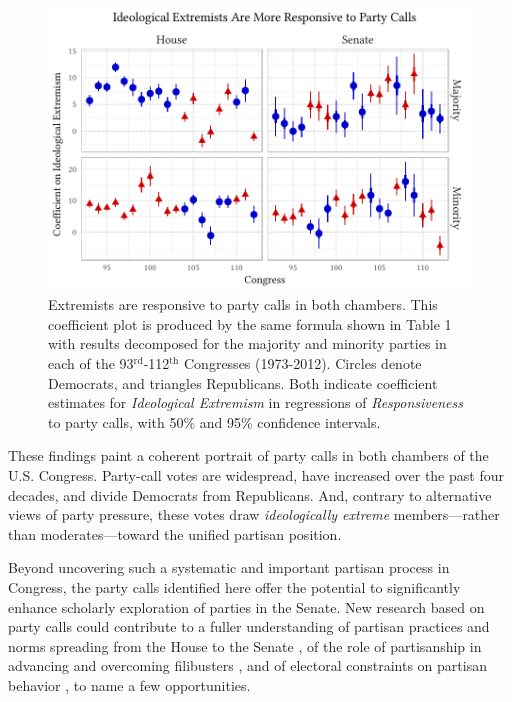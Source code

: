 \documentclass[12pt]{article}
\begin{document}
\begin{figure}[t]
\centering
\includegraphics{extremism-responsiveness.pdf}
\caption{Extremists are responsive to party calls in both chambers.
This coefficient plot is produced by the same formula shown in Table 1 with results decomposed for the majority and minority parties in each of the 93$^{\text{rd}}$-112$^{\text{th}}$ Congresses (1973-2012).
Circles denote Democrats, and triangles Republicans.
Both indicate coefficient estimates for \textit{Ideological Extremism} in regressions of \emph{Responsiveness} to party calls, with 50\% and 95\% confidence intervals.
\label{fig-extremism-responsiveness}}
\end{figure}

These findings paint a coherent portrait of party calls in both chambers of the U.S. Congress. Party-call votes are widespread, have increased over the past four decades, and divide Democrats from Republicans. And, contrary to alternative views of party pressure, these votes draw \emph{ideologically extreme} members---rather than moderates---toward the unified partisan position.

Beyond uncovering such a systematic and important partisan process in Congress, the party calls identified here offer the potential to significantly enhance scholarly exploration of parties in the Senate. New research based on party calls could contribute to a fuller understanding of partisan practices and norms spreading from the House to the Senate \citep[e.g.,][]{Theriault:2013}, of the role of partisanship in advancing and overcoming filibusters \citep[e.g.,][]{Wawro:2013}, and of electoral constraints on partisan behavior \citep[e.g.,][]{Levitt:1996}, to name a few opportunities.
\end{document}
